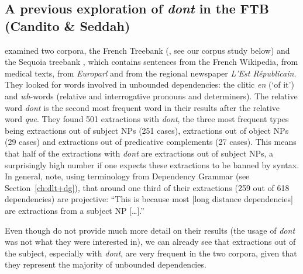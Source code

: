 \subsection{A previous exploration of \emph{dont} in the FTB (Candito \& Seddah)}
\label{ch-candito-2012}

\citet{Candito.2012.ldd} examined two corpora, the French Treebank (\citealt{Abeille.2019.FTB}, see our corpus study below) and the Sequoia treebank \citep{Candito.2012.Sequoia}, which contains sentences from the French Wikipedia, from medical texts, from \textit{Europarl} and from the regional newspaper \emph{L’Est Républicain}. They looked for words involved in unbounded dependencies: the clitic \emph{en} (`of it') and \textit{wh}-words (relative and interrogative pronouns and determiners). The relative word \emph{dont} is the second most frequent word in their results after the relative word \emph{que}. They found 501 extractions with \emph{dont}, the three most frequent types being extractions out of subject NPs (251 cases), extractions out of object NPs (29 cases) and extractions out of predicative complements (27 cases). This means that half of the extractions with \emph{dont} are extractions out of subject NPs, a surprisingly high number if one expects these extractions to be banned by syntax. In general, \citeauthor{Candito.2012.ldd} note, using terminology from Dependency Grammar (see Section~\ref{ch:dlt+dg}), that around one third of their extractions (259 out of 618 dependencies) are projective: ``This is because most [long distance dependencies] are extractions from a subject NP [\dots].''

Even though \citeauthor{Candito.2012.ldd} do not provide much more detail on their results (the usage of \emph{dont} was not what they were interested in), we can already see that extractions out of the subject, especially with \emph{dont}, are very frequent in the two corpora, given that they represent the majority of unbounded dependencies. 